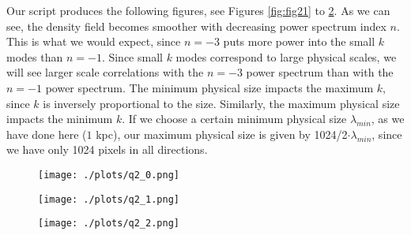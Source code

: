 


Our script produces the following figures, see Figures \ref{fig:fig21} to \ref{fig:fig23}. As we can see, the density field becomes smoother with decreasing power spectrum index $n$. This is what we would expect, since $n=-3$ puts more power into the small $k$ modes than $n=-1$. Since small $k$ modes correspond to large physical scales, we will see larger scale correlations with the $n=-3$ power spectrum than with the $n=-1$ power spectrum. The minimum physical size impacts the maximum $k$, since $k$ is inversely proportional to the size. Similarly, the maximum physical size impacts the minimum $k$. If we choose a certain minimum physical size $\lambda_{min}$, as we have done here ($1$ kpc), our maximum physical size is given by 1024/2$\cdot \lambda_{min}$, since we have only 1024 pixels in all directions.


\begin{figure}[ht]\centering
\begin{minipage}[t]{.5\textwidth}
\centering
\texttt{[image: ./plots/q2\_0.png]}
\captionsetup{width=0.8\linewidth}
\label{fig:fig21}
\end{minipage}%
\begin{minipage}[t]{.5\textwidth}
\centering
\texttt{[image: ./plots/q2\_1.png]}
\captionsetup{width=0.8\linewidth}
\label{fig:fig22}
\end{minipage}%
\end{figure}

\begin{figure}[ht]\centering
\begin{minipage}[t]{.5\textwidth}
\centering
\texttt{[image: ./plots/q2\_2.png]}
\captionsetup{width=0.8\linewidth}
\label{fig:fig23}
\end{minipage}%
\begin{minipage}[t]{.5\textwidth}
\centering
\end{minipage}%
\end{figure}
